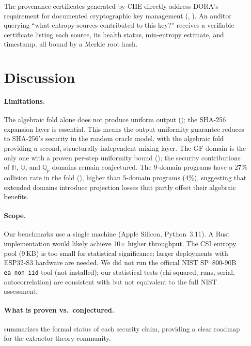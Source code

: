 \documentclass[conference,compsoc]{IEEEtran}
\newcommand{\che}{\textsc{CHE}\xspace}
\newcommand{\Q}{\mathbb{Q}}
\begin{document}
The provenance certificates generated by \che directly address
DORA's requirement for documented cryptographic key management
(, ).
%
An auditor querying ``what entropy sources contributed to this key?''
receives a verifiable certificate listing each source, its health
status, min-entropy estimate, and timestamp, all bound by a Merkle
root hash.


\section{Discussion}
\label{sec:discussion}

\paragraph{Limitations.}
The algebraic fold alone does not produce uniform output
(); the SHA-256 expansion layer is essential.
%
This means the output uniformity guarantee reduces to SHA-256's
security in the random oracle model, with the algebraic fold
providing a second, structurally independent mixing layer.
%
The GF domain is the only one with a proven per-step uniformity
bound (); the security contributions of
$\mathbb{H}$, $\mathbb{O}$, and $\Q_p$ domains remain
conjectured.
%
The 9-domain programs have a 27\% collision rate in the fold
(), higher than 5-domain programs (4\%),
suggesting that extended domains introduce projection losses that
partly offset their algebraic benefits.

\paragraph{Scope.}
Our benchmarks use a single machine (Apple Silicon, Python~3.11).
A Rust implementation would likely achieve 10$\times$ higher
throughput.
%
The CSI entropy pool (9\,KB) is too small for statistical
significance; larger deployments with ESP32-S3 hardware are needed.
%
We did not run the official NIST SP~800-90B \texttt{ea\_non\_iid}
tool (not installed); our statistical tests (chi-squared, runs,
serial, autocorrelation) are consistent with but not equivalent to
the full NIST assessment.

\paragraph{What is proven vs.\ conjectured.}
 summarizes the formal status of
each security claim, providing a clear roadmap for the extractor
theory community.
\end{document}
